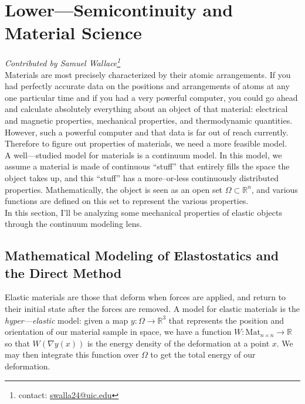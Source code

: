 \documentclass[../main.tex]{subfile}
\begin{document}
\chapter{Lower---Semicontinuity and Material Science}

\emph{Contributed by Samuel Wallace\footnote{contact: \href{mailto:swalla24@uic.edu}{swalla24@uic.edu}}} \\

Materials are most precisely characterized by their atomic arrangements.
If you had perfectly accurate data on the positions and arrangements of atoms at any one particular time and if you had a very powerful computer, you could go ahead and calculate absolutely everything about an object of that material: electrical and magnetic properties, mechanical properties, and thermodynamic quantities.
However, such a powerful computer and that data is far out of reach currently.
Therefore to figure out properties of materials, we need a more feasible model. \\

A well---studied model for materials is a continuum model.
In this model, we assume a material is made of continuous ``stuff'' that entirely fills the space the object takes up, and this ``stuff'' has a more--or-less continuously distributed properties.
Mathematically, the object is seen as an open set $\Omega \subset \mathbb{R}^n$, and various functions are defined on this set to represent the various properties. \\

In this section, I'll be analyzing some mechanical properties of elastic objects through the continuum modeling lens.

\section{Mathematical Modeling of Elastostatics and the Direct Method}

Elastic materials are those that deform when forces are applied, and return to their initial state after the forces are removed.
A model for elastic materials is the \emph{hyper---elastic} model: given a map $y: \Omega \to \mathbb{R}^3$ that represents the position and orientation of our material sample in space, we have a function $W: \mathrm{Mat}_{n\times n} \to \mathbb{R}$ so that $W(\nabla y(x))$ is the energy density of the deformation at a point $x$.
We may then integrate this function over $\Omega$ to get the total energy of our deformation. \\
\end{document}
